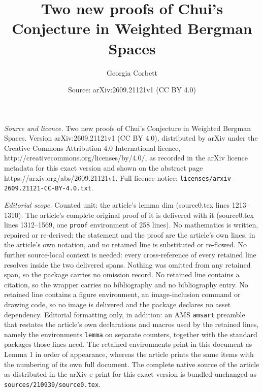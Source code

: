 \documentclass[10pt,a4paper]{amsart}
\title{Two new proofs of Chui's Conjecture in Weighted Bergman Spaces}
\author{Georgia Corbett}
\date{Source: arXiv:2609.21121v1 (CC BY 4.0)}
\begin{document}
\maketitle

\noindent\emph{Source and licence.} Two new proofs of Chui's Conjecture in Weighted Bergman Spaces. Version arXiv:2609.21121v1 (CC BY 4.0), distributed by arXiv under the Creative Commons Attribution 4.0 International licence, http://creativecommons.org/licenses/by/4.0/, as recorded in the arXiv licence metadata for this exact version and shown on the abstract page https://arxiv.org/abs/2609.21121v1. Full licence notice: \texttt{licenses/arxiv-2609.21121-CC-BY-4.0.txt}.\par\smallskip

\noindent\textit{Editorial scope.} Counted unit: the article's lemma dim (source0.tex lines 1213--1310). The article's complete original proof of it is delivered with it (source0.tex lines 1312--1569, one \texttt{proof} environment of 258 lines). No mathematics is written, repaired or re-derived: the statement and the proof are the article's own lines, in the article's own notation, and no retained line is substituted or re-flowed.  No further source-local context is needed: every cross-reference of every retained line resolves inside the two delivered spans.  Nothing was omitted from any retained span, so the package carries no omission record.  No retained line contains a citation, so the wrapper carries no bibliography and no bibliography entry.  No retained line contains a figure environment, an image-inclusion command or drawing code, so no image is delivered and the package declares no asset dependency.  Editorial formatting only, in addition: an AMS \texttt{amsart} preamble that restates the article's own declarations and macros used by the retained lines, namely the environments \texttt{lemma} on separate counters, together with the standard packages those lines need.  The retained environments print in this document as Lemma 1 in order of appearance, whereas the article prints the same items with the numbering of its own full document.  The complete native source of the article as distributed in the arXiv e-print for this exact version is bundled unchanged as \texttt{sources/210939/source0.tex}.
\end{document}
